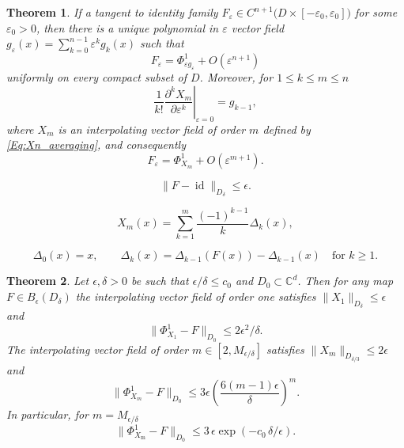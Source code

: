 \documentclass[10pt,a4paper]{amsart}
\newtheorem{thm}{Theorem}
\newcommand{\C}{\mathbb{C}}
\begin{document}
\begin{thm} \label{Thm:formal}
If a tangent to identity family $F_\varepsilon\in C^{n+1}\bigl(D\times [-\varepsilon_0,\varepsilon_0]\bigr)$
for some $\varepsilon_0>0$,
then there is a unique polynomial in $\varepsilon$ vector field
\(
g_\varepsilon(x)=\sum_{k=0}^{n-1}\varepsilon^k g_k(x)
\)
such that 
\[
F_\varepsilon=\Phi^1_{\varepsilon g_\varepsilon}+O(\varepsilon^{n+1})
\]
uniformly on every compact subset of $D$. Moreover, for   $1\le k\le m \le n$
\begin{equation}\label{Eq:g_k}
\frac{1}{k!}\left.\frac{\partial^k X_m}{\partial \varepsilon^{k}}\right|_{\varepsilon=0}=g_{k-1},    
\end{equation}
where $X_m$ is an interpolating vector field of order $m$ defined by \eqref{Eq:Xn_averaging},
and consequently
\begin{equation}\label{Eq:errorbound}
F_\varepsilon=\Phi^1_{X_m}+O(\varepsilon^{m+1}).
\end{equation}
\end{thm}

\begin{equation}\label{Eq:f-xi}
\|F-\operatorname{id}\|_{D_\delta}\le \epsilon.
\end{equation}

\begin{equation}\label{Eq:interpol_VF}
	X_m(x)=\sum_{k=1}^m\frac{(-1)^{k-1}}{k}\Delta_k(x),
\end{equation}

\begin{equation}\label{Eq:finite-diff}
	\Delta_0(x)=x,
	\qquad 
	\Delta_{k}(x)=\Delta_{k-1}(F(x))-\Delta_{k-1}(x)
	\quad\text{for  $k\ge 1$}.
\end{equation}

\begin{thm}\label{Thm:alaNeishtadt}
Let $\epsilon,\delta>0$ be such that $\epsilon/\delta \le c_0$ and $D_0\subset \C^d$.
Then for any map $F\in B_{\epsilon}(D_\delta)$  the interpolating vector field 
of order one satisfies $\|X_1\|_{D_\delta}\le\epsilon $ and  
\begin{equation}
   \bigl\|\Phi^1_{X_1}-F \bigr\|_{D_0} 
  \le 2\epsilon^2/\delta.
\end{equation}
The interpolating vector field of order $m\in [2,M_{\epsilon/\delta}]$ satisfies $\|X_m\|_{D_{\delta/3}}
  \le 2\epsilon $ and
\begin{equation}\label{Eq:Phi-f}
    \bigl\|\Phi^1_{X_m}-F \bigr\|_{D_0} 
  \le   
    3\epsilon  \left( \frac{6 (m-1)\epsilon}{\delta}\right)^{m} .
\end{equation}
In particular, for $\displaystyle m =M_{\epsilon/\delta} $ 
\begin{equation}\label{Eq:expbound}
\bigl \|\Phi^1_{X_{\mathrm{m}}}-F \bigr\|_{D_0}\le 
3\,\epsilon \exp\left(- c_0\, \delta /\epsilon\right).
\end{equation}
\end{thm}
\end{document}
